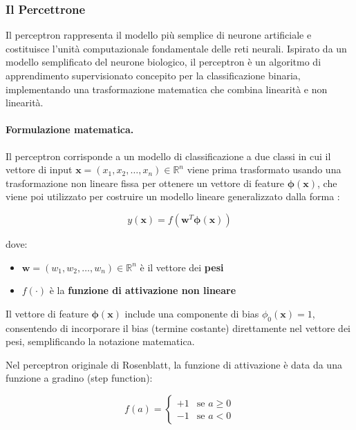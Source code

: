 \subsubsection{Il Percettrone}
Il perceptron \cite{rosenblatt1958perceptron} rappresenta il modello più semplice di neurone artificiale e costituisce l'unità computazionale fondamentale delle reti neurali. Ispirato da un modello semplificato del neurone biologico, il perceptron è un algoritmo di apprendimento supervisionato concepito per la classificazione binaria, implementando una trasformazione matematica che combina linearità e non linearità.

\paragraph{Formulazione matematica.} Il perceptron corrisponde a un modello di classificazione a due classi in cui il vettore di input $\mathbf{x} = (x_1, x_2, \dots, x_n) \in \mathbb{R}^n$ viene prima trasformato usando una trasformazione non lineare fissa per ottenere un vettore di feature $\boldsymbol{\phi}(\mathbf{x})$, che viene poi utilizzato per costruire un modello lineare generalizzato dalla forma \cite{bishop2006pattern}:


\begin{equation}
y(\mathbf{x}) = f\left(\mathbf{w}^T \boldsymbol{\phi}(\mathbf{x})\right)
\label{eq:perceptron}
\end{equation}


dove:
\begin{itemize}
\item $\mathbf{w} = (w_1, w_2, \dots, w_n) \in \mathbb{R}^n$ è il vettore dei \textbf{pesi}
\item $f(\cdot)$ è la \textbf{funzione di attivazione non lineare}
\end{itemize}

Il vettore di feature $\boldsymbol{\phi}(\mathbf{x})$ include una componente di bias $\phi_0(\mathbf{x}) = 1$, consentendo di incorporare il bias (termine costante) direttamente nel vettore dei pesi, semplificando la notazione matematica.

Nel perceptron originale di Rosenblatt, la funzione di attivazione è data da una funzione a gradino (step function):

\begin{equation}
f(a) = \begin{cases}
+1 & \text{se } a \geq 0 \\
-1 & \text{se } a < 0
\end{cases}
\label{eq:step_function}
\end{equation}

